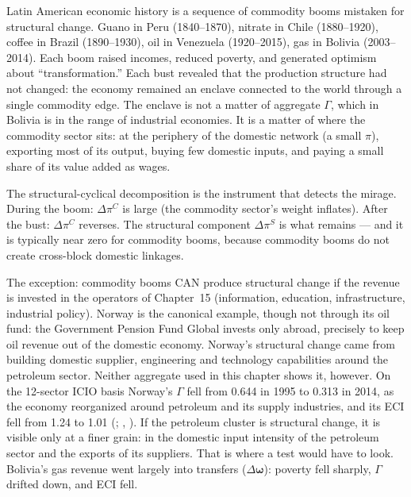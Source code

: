 \documentclass[../structural_economics_book.tex]{subfiles}
\begin{document}
\begin{prebisch}
Latin American economic history is a sequence of commodity booms mistaken for structural change. Guano in Peru (1840--1870), nitrate in Chile (1880--1920), coffee in Brazil (1890--1930), oil in Venezuela (1920--2015), gas in Bolivia (2003--2014). Each boom raised incomes, reduced poverty, and generated optimism about ``transformation.'' Each bust revealed that the production structure had not changed: the economy remained an enclave connected to the world through a single commodity edge. The enclave is not a matter of aggregate $\Gamma$, which in Bolivia is in the range of industrial economies. It is a matter of where the commodity sector sits: at the periphery of the domestic network (a small $\pi$), exporting most of its output, buying few domestic inputs, and paying a small share of its value added as wages.

The structural-cyclical decomposition is the instrument that detects the mirage. During the boom: $\Delta\pi^C$ is large (the commodity sector's weight inflates). After the bust: $\Delta\pi^C$ reverses. The structural component $\Delta\pi^S$ is what remains --- and it is typically near zero for commodity booms, because commodity booms do not create cross-block domestic linkages.

The exception: commodity booms CAN produce structural change if the revenue is invested in the operators of Chapter~15 (information, education, infrastructure, industrial policy). Norway is the canonical example, though not through its oil fund: the Government Pension Fund Global invests only abroad, precisely to keep oil revenue out of the domestic economy. Norway's structural change came from building domestic supplier, engineering and technology capabilities around the petroleum sector. Neither aggregate used in this chapter shows it, however. On the 12-sector ICIO basis Norway's $\Gamma$ fell from 0.644 in 1995 to 0.313 in 2014, as the economy reorganized around petroleum and its supply industries, and its ECI fell from 1.24 to 1.01 (\citealp{oecd2021icio,growthlab2026atlas}; , ). If the petroleum cluster is structural change, it is visible only at a finer grain: in the domestic input intensity of the petroleum sector and the exports of its suppliers. That is where a test would have to look. Bolivia's gas revenue went largely into transfers ($\Delta\boldsymbol{\omega}$): poverty fell sharply, $\Gamma$ drifted down, and ECI fell.
\end{prebisch}
\end{document}
